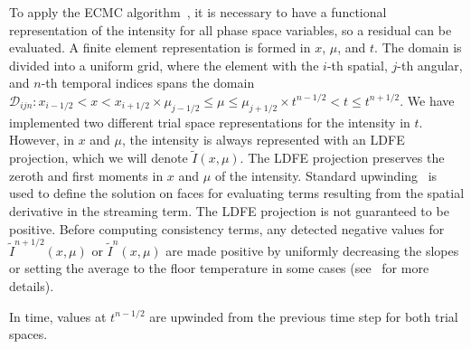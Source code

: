 \documentclass{anstrans}
\newcommand{\il}{{i-1/2}}
\newcommand{\ir}{{i+1/2}}
\newcommand{\jl}{{j-1/2}}
\newcommand{\jr}{{j+1/2}}
\begin{document}
To apply the ECMC algorithm~\cite{jake,bolding_nse}, it is necessary to have a functional representation
of the intensity for all phase space variables, so a residual can be evaluated.
A finite element representation is formed in $x$,
$\mu$, and $t$.  The domain is divided
into a uniform grid, where the element with the $i$-th spatial, $j$-th angular, and $n$-th temporal
indices spans the domain 
$\mathcal{D}_{ijn}: x_\il <  x < x_\ir \times \mu_\jl \leq \mu \leq \mu_\jr \times t^{n-1/2} < t 
\leq t^{n+1/2}$.
We have implemented two different trial space representations for the intensity in $t$.
However, in $x$ and $\mu$, the intensity is always represented with an
LDFE projection, which we will denote $\tilde I(x,\mu)$. 
The LDFE projection preserves the zeroth and first moments in $x$ and $\mu$ of the intensity.  
Standard upwinding~\cite{morel_ldtrt,bolding_nse} is used to define the solution on faces for evaluating terms resulting
from the spatial derivative in the streaming term.  The LDFE projection is not guaranteed to be
positive.  Before computing consistency terms, any detected negative values for $\tilde I^{n+1/2}(x,\mu)$ or $\tilde
I^{n}(x,\mu)$ are made positive by uniformly decreasing the slopes or setting the average to the
floor temperature in some cases (see~\cite{dissertation} for more details). 

In time, values at
$t^{n-1/2}$ are upwinded from the previous time step for both trial spaces.
\end{document}
